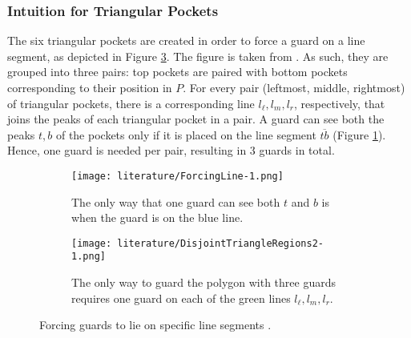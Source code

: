 \newpage
\subsubsection{Intuition for Triangular Pockets}
The six triangular pockets are created in order to force a guard on a line segment, as depicted in Figure \ref{fig:tb}. The figure is taken from \cite{abrahamsen2021art}. As such, they are grouped into three pairs: top pockets are paired with bottom pockets corresponding to their position in $P$. For every pair (leftmost, middle, rightmost) of triangular pockets, there is a corresponding line $l_\ell, l_m, l_r$, respectively, that joins the peaks of each triangular pocket in a pair. A guard can see both the peaks $t, b$ of the pockets only if it is placed on the line segment $\overline{tb}$ (Figure \ref{fig:forcing_line}). Hence, one guard is needed per pair, resulting in 3 guards in total.

\begin{figure}[h!]
    \centering
    \begin{subfigure}{0.3\textwidth}
        \centering
        \texttt{[image: literature/ForcingLine-1.png]}
        \caption{The only way that one guard can see both $t$ and $b$ is when the guard is on the blue line.}
        \label{fig:forcing_line}
    \end{subfigure}
    \hfill
    \begin{subfigure}{0.65\textwidth}
        \centering
        \texttt{[image: literature/DisjointTriangleRegions2-1.png]}
        \caption{The only way to guard the polygon with three guards requires one guard on each of the green lines $l_\ell, l_m, l_r$.}
        \label{fig:disjoint_triangle}
    \end{subfigure}
    \caption{Forcing guards to lie on specific line segments \cite{1057165}.}
    \label{fig:tb}
\end{figure}

